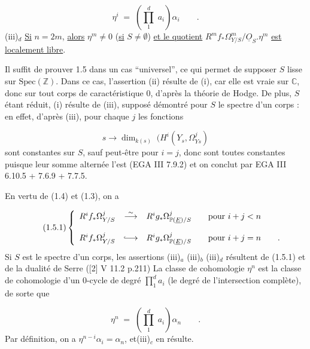 \begin{equation*}
\eta^i \;=\; \left( \prod_1^d \; a_i \right) \alpha_i \qquad .
\end{equation*}
(iii)$_d$ \underline{Si} $n = 2m$, \underline{alors} $\eta^m \neq 0$ (\underline{si} $S \neq \emptyset$) \underline{et le quotient} $R^m f_* \Omega^m_{Y/S}/\underline{O}_S . \eta^m$ \underline{est localement libre}.

Il suffit de prouver 1.5 dans un cas ``universel'', ce qui permet de supposer $S$ lisse sur $\mathrm{Spec}(\mathbb{Z})$. Dans ce cas, l'assertion (ii) résulte de (i), car elle est vraie sur $\mathbb{C}$, donc sur tout corps de caractéristique $0$, d'après la théorie de Hodge. De plus, $S$ étant réduit, (i) résulte de (iii), supposé démontré pour $S$ le spectre d'un corps : en effet, d'après (iii), pour chaque $j$ les fonctions

\begin{equation*}
s \longrightarrow \dim_{k(s)} \; (H^i(Y_s,\Omega^j_{Ys})
\end{equation*}
sont constantes sur $S$, sauf peut-être pour $i = j$, donc sont toutes constantes puisque leur somme alternée l'est (EGA III 7.9.2) et on conclut par EGA III 6.10.5 + 7.6.9 + 7.7.5.

En vertu de (1.4) et (1.3), on a

\begin{equation}\tag{1.5.1}
\left\{
\begin{array}{ccl}
R^i f_* \Omega^j_{Y/S} & \stackrel{\sim}{\longrightarrow} & R^i g_* \Omega^j_{\mathbb{P}(\underline{E})/S} \qquad \mbox{pour } i+j < n \\[3ex]
R^i f_* \Omega^j_{Y/S} & \lhook\joinrel\longrightarrow & R^i g_* \Omega^j_{\mathbb{P}(\underline{E})/S} \qquad \mbox{pour } i+j = n \qquad .
\end{array}
\right.
\end{equation}
Si $S$ est le spectre d'un corps, les assertions (iii)$_a$ (iii)$_b$ (iii)$_d$ résultent de (1.5.1) et de la dualité de Serre ([2] V 11.2 p.211) La classe de
cohomologie $\eta^n$ est la classe de cohomologie d'un $0$-cycle de degré $\prod_1^d a_i$ (le degré de l'intersection complète), de sorte que

\begin{equation*}
\eta^n \;=\; \left( \prod_1^d \; a_i \right) \alpha_n \qquad .
\end{equation*}
Par définition, on a $\eta^{n-i} \alpha_i = \alpha_n$, et(iii)$_c$ en résulte.

